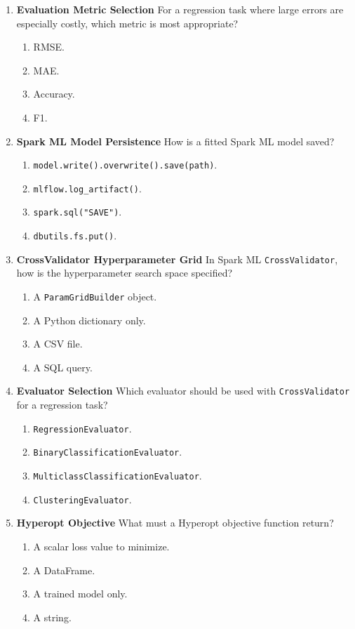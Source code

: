\documentclass{article}
\begin{document}
\begin{enumerate}[label=\textbf{Q\arabic*.}]
		\item \textbf{Evaluation Metric Selection}
		For a regression task where large errors are especially costly, which metric is most appropriate?
		\begin{enumerate}[label=\Alph*.]
			\item RMSE.
			\item MAE.
			\item Accuracy.
			\item F1.
		\end{enumerate}
		
		\item \textbf{Spark ML Model Persistence}
		How is a fitted Spark ML model saved?
		\begin{enumerate}[label=\Alph*.]
			\item \texttt{model.write().overwrite().save(path)}.
			\item \texttt{mlflow.log\_artifact()}.
			\item \texttt{spark.sql("SAVE")}.
			\item \texttt{dbutils.fs.put()}.
		\end{enumerate}
		
		\item \textbf{CrossValidator Hyperparameter Grid}
		In Spark ML \texttt{CrossValidator}, how is the hyperparameter search space specified?
		\begin{enumerate}[label=\Alph*.]
			\item A \texttt{ParamGridBuilder} object.
			\item A Python dictionary only.
			\item A CSV file.
			\item A SQL query.
		\end{enumerate}
		
		\item \textbf{Evaluator Selection}
		Which evaluator should be used with \texttt{CrossValidator} for a regression task?
		\begin{enumerate}[label=\Alph*.]
			\item \texttt{RegressionEvaluator}.
			\item \texttt{BinaryClassificationEvaluator}.
			\item \texttt{MulticlassClassificationEvaluator}.
			\item \texttt{ClusteringEvaluator}.
		\end{enumerate}
		
		\item \textbf{Hyperopt Objective}
		What must a Hyperopt objective function return?
		\begin{enumerate}[label=\Alph*.]
			\item A scalar loss value to minimize.
			\item A DataFrame.
			\item A trained model only.
			\item A string.
		\end{enumerate}
		

\end{enumerate}
\end{document}
